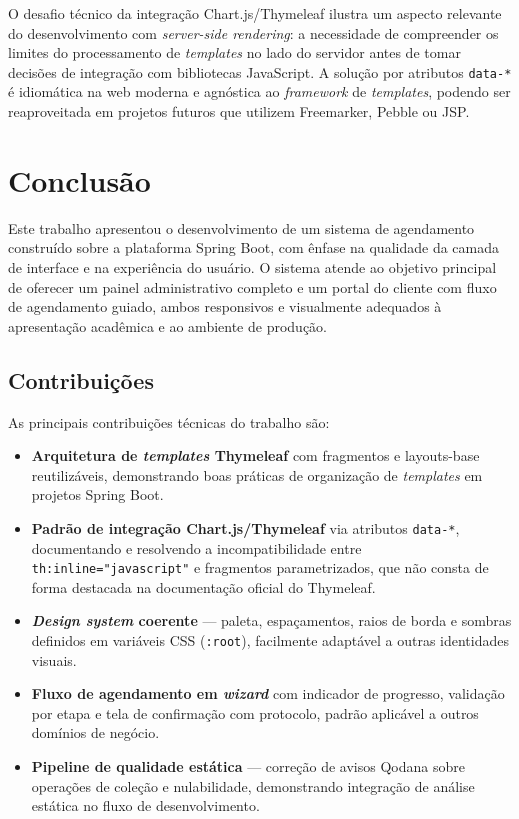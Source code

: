 O desafio técnico da integração Chart.js/Thymeleaf ilustra um aspecto
relevante do desenvolvimento com \textit{server-side rendering}: a
necessidade de compreender os limites do processamento de \textit{templates}
no lado do servidor antes de tomar decisões de integração com bibliotecas
JavaScript.  A solução por atributos \texttt{data-*} é idiomática na web
moderna e agnóstica ao \textit{framework} de \textit{templates}, podendo ser
reaproveitada em projetos futuros que utilizem Freemarker, Pebble ou JSP.



\section{Conclusão}

Este trabalho apresentou o desenvolvimento de um sistema de agendamento
construído sobre a plataforma Spring Boot, com ênfase na qualidade da camada
de interface e na experiência do usuário.  O sistema atende ao objetivo
principal de oferecer um painel administrativo completo e um portal do
cliente com fluxo de agendamento guiado, ambos responsivos e visualmente
adequados à apresentação acadêmica e ao ambiente de produção.

\subsection{Contribuições}

As principais contribuições técnicas do trabalho são:

\begin{itemize}
  \item \textbf{Arquitetura de \textit{templates} Thymeleaf} com fragmentos e
    layouts-base reutilizáveis, demonstrando boas práticas de organização de
    \textit{templates} em projetos Spring Boot.
  \item \textbf{Padrão de integração Chart.js/Thymeleaf} via atributos
    \texttt{data-*}, documentando e resolvendo a incompatibilidade entre
    \texttt{th:inline="javascript"} e fragmentos parametrizados, que não
    consta de forma destacada na documentação oficial do Thymeleaf.
  \item \textbf{\textit{Design system} coerente} — paleta, espaçamentos, raios
    de borda e sombras definidos em variáveis CSS (\texttt{:root}), facilmente
    adaptável a outras identidades visuais.
  \item \textbf{Fluxo de agendamento em \textit{wizard}} com indicador de
    progresso, validação por etapa e tela de confirmação com protocolo,
    padrão aplicável a outros domínios de negócio.
  \item \textbf{Pipeline de qualidade estática} — correção de avisos Qodana
    sobre operações de coleção e nulabilidade, demonstrando integração de
    análise estática no fluxo de desenvolvimento.
\end{itemize}

